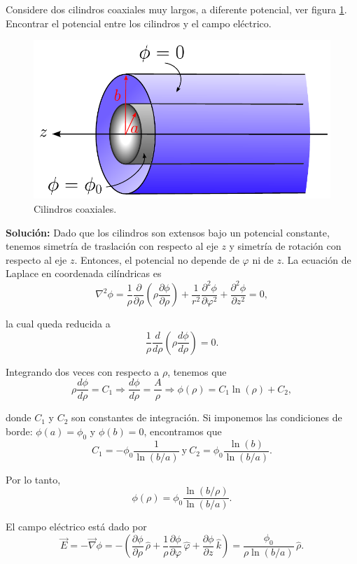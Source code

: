 \begin{ejemplo}
    Considere dos cilindros coaxiales muy largos, a diferente potencial, ver figura \ref{fig:CilindrosCoaxiales}. Encontrar el potencial entre los cilindros y el campo eléctrico.

    \begin{figure}[H]
        \centering
        \includegraphics[scale = 0.65]{Figuras/Ej-EcLaplace.pdf}
        \caption{Cilindros coaxiales.}
        \label{fig:CilindrosCoaxiales}
    \end{figure}

    \textbf{Solución:} Dado que los cilindros son extensos bajo un potencial constante, tenemos simetría de traslación con respecto al eje $z$ y simetría de rotación con respecto al eje $z$. Entonces, el potencial no depende de $\varphi$ ni de $z$. La ecuación de Laplace en coordenada cilíndricas es
    $$\nabla^2 \phi = \frac{1}{\rho} \frac{\partial}{\partial \rho}\left(\rho \frac{\partial \phi}{\partial \rho} \right) + \frac{1}{r^2} \frac{\partial^2 \phi}{\partial \varphi^2} + \frac{\partial^2 \phi}{\partial z^2} = 0,$$

    la cual queda reducida a
    $$\frac{1}{\rho} \frac{d}{d\rho}\left( \rho \frac{d \phi}{d\rho} \right) = 0.$$

    Integrando dos veces con respecto a $\rho$, tenemos que
    $$\rho \frac{d\phi}{d\rho} = C_1 \Rightarrow \frac{d \phi}{d\rho} = \frac{A}{\rho} \Rightarrow \phi(\rho) = C_1 \ln(\rho) + C_2,$$

    donde $C_1$ y $C_2$ son constantes de integración. Si imponemos las condiciones de borde: $\phi(a) = \phi_0$ y $\phi(b) = 0$, encontramos que
    $$C_1 = - \phi_0\frac{1}{\ln(b/a)}~\text{y}~ C_2 = \phi_0 \frac{\ln(b)}{\ln(b/a)}.$$

    Por lo tanto,
    $$\phi(\rho) = \phi_0 \frac{\ln(b/\rho)}{\ln(b/a)}.$$

    El campo eléctrico está dado por
    $$\Vec{E} = - \Vec{\nabla} \phi = - \left( \frac{\partial \phi}{\partial \rho} \,\hat{\rho} + \frac{1}{\rho} \frac{\partial \phi}{\partial \varphi} \,\hat{\varphi} + \frac{\partial \phi}{\partial z}\,\hat{k} \right) = \frac{\phi_0}{\rho \ln(b/a)} \,\hat{\rho}.$$
\end{ejemplo}

